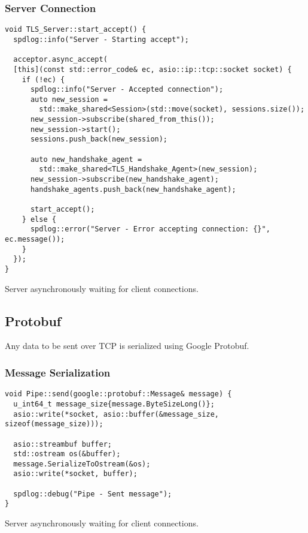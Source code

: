 \documentclass[12pt, letterpaper]{article}
\newenvironment{code}{\captionsetup{type=listing}}{}
\begin{document}
\pagebreak

\subsubsection{Server Connection}

\begin{code}
	\begin{verbatim}
void TLS_Server::start_accept() {
  spdlog::info("Server - Starting accept");
	
  acceptor.async_accept(
  [this](const std::error_code& ec, asio::ip::tcp::socket socket) {
    if (!ec) {
      spdlog::info("Server - Accepted connection");
      auto new_session =  
        std::make_shared<Session>(std::move(socket), sessions.size());
      new_session->subscribe(shared_from_this());
      new_session->start();
      sessions.push_back(new_session);
		
      auto new_handshake_agent = 
        std::make_shared<TLS_Handshake_Agent>(new_session);
      new_session->subscribe(new_handshake_agent);
      handshake_agents.push_back(new_handshake_agent);
		
      start_accept();
    } else {
      spdlog::error("Server - Error accepting connection: {}", ec.message());
    }
  });
}
	\end{verbatim}
	\caption{Server asynchronously waiting for client connections.}
	\label{serverConnection}
\end{code}

\subsection{Protobuf}
Any data to be sent over TCP is serialized using Google Protobuf.

\subsubsection{Message Serialization}
\begin{code}
	\begin{verbatim}
void Pipe::send(google::protobuf::Message& message) {
  u_int64_t message_size{message.ByteSizeLong()};
  asio::write(*socket, asio::buffer(&message_size, sizeof(message_size)));
	
  asio::streambuf buffer;
  std::ostream os(&buffer);
  message.SerializeToOstream(&os);
  asio::write(*socket, buffer);
	
  spdlog::debug("Pipe - Sent message");
}
	\end{verbatim}
	\caption{Server asynchronously waiting for client connections.}
	\label{pipeSend}
\end{code}
\end{document}
